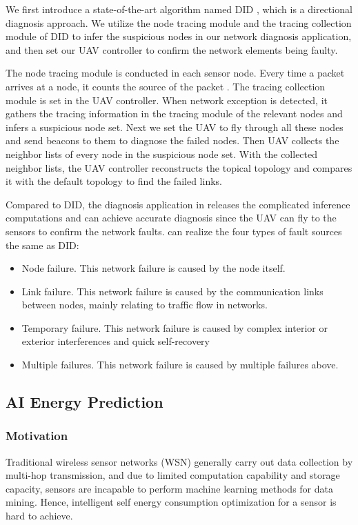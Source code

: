 We first introduce a state-of-the-art algorithm named DID 
\cite{gong2015directional}, which is a directional diagnosis approach.
We utilize the node tracing module and the tracing collection module of DID
to infer the suspicious nodes in our network diagnosis application, 
and then set our UAV controller to confirm the network elements being faulty.

The node tracing module is conducted in each sensor node. 
Every time a packet arrives at a node, it counts
the source of the packet . The tracing collection module
is set in the UAV controller. When network exception is detected, 
it gathers the tracing information in the tracing module of the relevant nodes
and infers a suspicious node set. Next we set the UAV to fly through all these nodes 
and send beacons to them to diagnose the failed nodes. 
Then UAV collects the neighbor lists of every node in the suspicious node set.
With the collected neighbor lists, the UAV controller reconstructs the topical topology and 
compares it with the default topology to find the failed links.

Compared to DID, the diagnosis application in {\sdn} releases the complicated inference
computations and can achieve accurate diagnosis since the UAV can fly to the sensors 
to confirm the network faults. {\sdn} can realize the four types of fault sources the same as DID:  
\begin{itemize}
\item	Node failure. This network failure is caused by the node itself.
\item	Link failure. This network failure is caused by the communication links 
between nodes, mainly relating to traffic flow in networks.
\item	Temporary failure. This  network failure is caused by complex interior or exterior 
interferences and quick self-recovery
\item	Multiple failures. This  network failure is caused by multiple failures above.
\end{itemize}

\subsection{AI Energy Prediction}

\subsubsection{Motivation}
Traditional wireless sensor networks (WSN)  generally carry out data 
collection by multi-hop transmission,
and due to limited computation capability and storage capacity, sensors are incapable
to perform machine learning methods for data mining. 
Hence, intelligent self energy consumption optimization for a sensor is hard to achieve.


